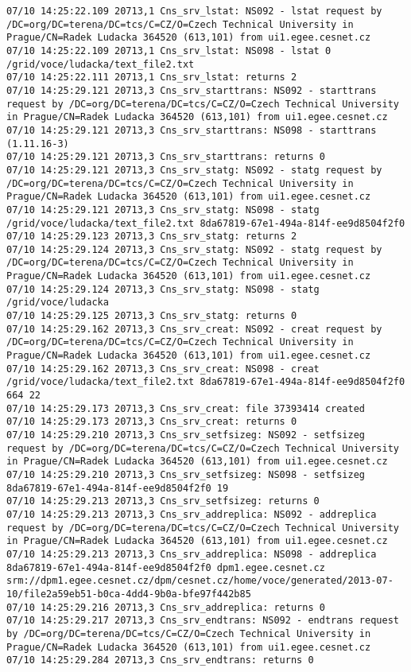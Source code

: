 \documentclass[a4paper, 11pt]{article} %
\begin{document}
\begin{lstlisting}[label={log:lcgcr1},caption={lcg-cr --vo voce -d dpm1.egee.cesnet.cz -l lfn:/grid/voce/ludacka/text\_file2.txt "file://\$PWD/text\_file2.txt"}]
07/10 14:25:22.109 20713,1 Cns_srv_lstat: NS092 - lstat request by /DC=org/DC=terena/DC=tcs/C=CZ/O=Czech Technical University in Prague/CN=Radek Ludacka 364520 (613,101) from ui1.egee.cesnet.cz
07/10 14:25:22.109 20713,1 Cns_srv_lstat: NS098 - lstat 0 /grid/voce/ludacka/text_file2.txt
07/10 14:25:22.111 20713,1 Cns_srv_lstat: returns 2
07/10 14:25:29.121 20713,3 Cns_srv_starttrans: NS092 - starttrans request by /DC=org/DC=terena/DC=tcs/C=CZ/O=Czech Technical University in Prague/CN=Radek Ludacka 364520 (613,101) from ui1.egee.cesnet.cz
07/10 14:25:29.121 20713,3 Cns_srv_starttrans: NS098 - starttrans (1.11.16-3)
07/10 14:25:29.121 20713,3 Cns_srv_starttrans: returns 0
07/10 14:25:29.121 20713,3 Cns_srv_statg: NS092 - statg request by /DC=org/DC=terena/DC=tcs/C=CZ/O=Czech Technical University in Prague/CN=Radek Ludacka 364520 (613,101) from ui1.egee.cesnet.cz
07/10 14:25:29.121 20713,3 Cns_srv_statg: NS098 - statg /grid/voce/ludacka/text_file2.txt 8da67819-67e1-494a-814f-ee9d8504f2f0
07/10 14:25:29.123 20713,3 Cns_srv_statg: returns 2
07/10 14:25:29.124 20713,3 Cns_srv_statg: NS092 - statg request by /DC=org/DC=terena/DC=tcs/C=CZ/O=Czech Technical University in Prague/CN=Radek Ludacka 364520 (613,101) from ui1.egee.cesnet.cz
07/10 14:25:29.124 20713,3 Cns_srv_statg: NS098 - statg /grid/voce/ludacka 
07/10 14:25:29.125 20713,3 Cns_srv_statg: returns 0
07/10 14:25:29.162 20713,3 Cns_srv_creat: NS092 - creat request by /DC=org/DC=terena/DC=tcs/C=CZ/O=Czech Technical University in Prague/CN=Radek Ludacka 364520 (613,101) from ui1.egee.cesnet.cz
07/10 14:25:29.162 20713,3 Cns_srv_creat: NS098 - creat /grid/voce/ludacka/text_file2.txt 8da67819-67e1-494a-814f-ee9d8504f2f0 664 22
07/10 14:25:29.173 20713,3 Cns_srv_creat: file 37393414 created
07/10 14:25:29.173 20713,3 Cns_srv_creat: returns 0
07/10 14:25:29.210 20713,3 Cns_srv_setfsizeg: NS092 - setfsizeg request by /DC=org/DC=terena/DC=tcs/C=CZ/O=Czech Technical University in Prague/CN=Radek Ludacka 364520 (613,101) from ui1.egee.cesnet.cz
07/10 14:25:29.210 20713,3 Cns_srv_setfsizeg: NS098 - setfsizeg 8da67819-67e1-494a-814f-ee9d8504f2f0 19
07/10 14:25:29.213 20713,3 Cns_srv_setfsizeg: returns 0
07/10 14:25:29.213 20713,3 Cns_srv_addreplica: NS092 - addreplica request by /DC=org/DC=terena/DC=tcs/C=CZ/O=Czech Technical University in Prague/CN=Radek Ludacka 364520 (613,101) from ui1.egee.cesnet.cz
07/10 14:25:29.213 20713,3 Cns_srv_addreplica: NS098 - addreplica 8da67819-67e1-494a-814f-ee9d8504f2f0 dpm1.egee.cesnet.cz srm://dpm1.egee.cesnet.cz/dpm/cesnet.cz/home/voce/generated/2013-07-10/file2a59eb51-b0ca-4dd4-9b0a-bfe97f442b85
07/10 14:25:29.216 20713,3 Cns_srv_addreplica: returns 0
07/10 14:25:29.217 20713,3 Cns_srv_endtrans: NS092 - endtrans request by /DC=org/DC=terena/DC=tcs/C=CZ/O=Czech Technical University in Prague/CN=Radek Ludacka 364520 (613,101) from ui1.egee.cesnet.cz
07/10 14:25:29.284 20713,3 Cns_srv_endtrans: returns 0
\end{lstlisting}
\end{document}
